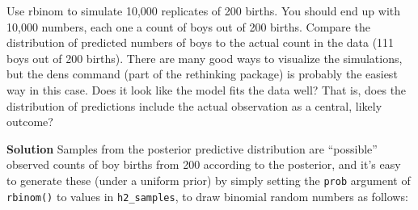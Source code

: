 \documentclass[
]{book}
\begin{document}
Use rbinom to simulate 10,000 replicates of 200 births. You should end up with 10,000 numbers, each one a count of boys out of 200 births. Compare the distribution of predicted numbers of boys to the actual count in the data (111 boys out of 200 births). There are many good ways to visualize the simulations, but the dens command (part of the rethinking package) is probably the easiest way in this case. Does it look like the model fits the data well? That is, does the distribution of predictions include the actual observation as a central, likely outcome?

\textbf{Solution}
Samples from the posterior predictive distribution are ``possible'' observed counts of boy births from 200 according to the posterior, and it's easy to generate these (under a uniform prior) by simply setting the \texttt{prob} argument of \texttt{rbinom()} to values in \texttt{h2\_samples}, to draw binomial random numbers as follows:
\end{document}
